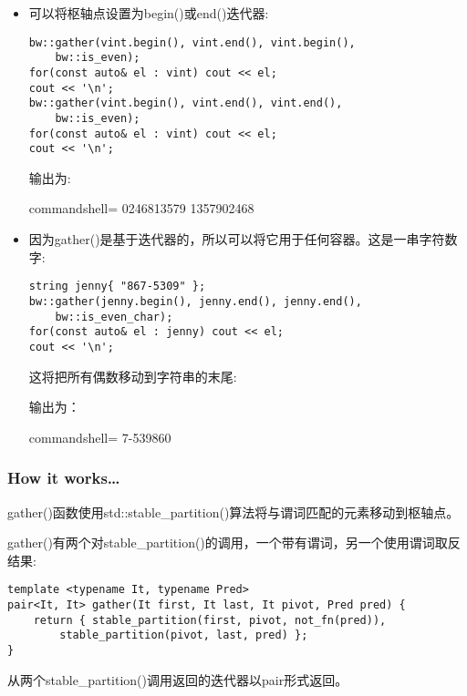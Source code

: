 \begin{itemize}
gather()函数返回一对只包含偶数值的迭代器:

\begin{lstlisting}[style=styleCXX]
auto& [it1, it2] = gathered_even;
for(auto it{ it1 }; it < it2; ++it) cout << *it;
cout << '\n';
\end{lstlisting}

输出为:

\begin{tcblisting}{commandshell={}}
02468
\end{tcblisting}

\item 
可以将枢轴点设置为begin()或end()迭代器:

\begin{lstlisting}[style=styleCXX]
bw::gather(vint.begin(), vint.end(), vint.begin(),
	bw::is_even);
for(const auto& el : vint) cout << el;
cout << '\n';
bw::gather(vint.begin(), vint.end(), vint.end(),
	bw::is_even);
for(const auto& el : vint) cout << el;
cout << '\n';
\end{lstlisting}

输出为:

\begin{tcblisting}{commandshell={}}
0246813579
1357902468
\end{tcblisting}

\item 
因为gather()是基于迭代器的，所以可以将它用于任何容器。这是一串字符数字:

\begin{lstlisting}[style=styleCXX]
string jenny{ "867-5309" };
bw::gather(jenny.begin(), jenny.end(), jenny.end(),
	bw::is_even_char);
for(const auto& el : jenny) cout << el;
cout << '\n';
\end{lstlisting}

这将把所有偶数移动到字符串的末尾:

输出为：

\begin{tcblisting}{commandshell={}}
7-539860
\end{tcblisting}

\end{itemize}

\subsubsection{How it works…}

gather()函数使用std::stable\_partition()算法将与谓词匹配的元素移动到枢轴点。

gather()有两个对stable\_partition()的调用，一个带有谓词，另一个使用谓词取反结果:

\begin{lstlisting}[style=styleCXX]
template <typename It, typename Pred>
pair<It, It> gather(It first, It last, It pivot, Pred pred) {
	return { stable_partition(first, pivot, not_fn(pred)),
		stable_partition(pivot, last, pred) };
}
\end{lstlisting}

从两个stable\_partition()调用返回的迭代器以pair形式返回。










